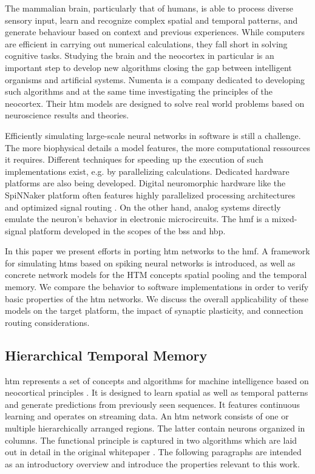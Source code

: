 The mammalian brain, particularly that of humans, is able to process diverse
sensory input, learn and recognize complex spatial and temporal patterns, and
generate behaviour based on context and previous experiences. While computers
are efficient in carrying out numerical calculations, they fall short in solving
cognitive tasks. Studying the brain and the neocortex in particular is an
important step to develop new algorithms closing the gap between intelligent
organisms and artificial systems. Numenta is a company dedicated to developing
such algorithms and at the same time investigating the principles of the
neocortex. Their \gls{htm} models are designed to solve real world problems
based on neuroscience results and theories.

Efficiently simulating large-scale neural networks in software is still a
challenge. The more biophysical details a model features, the more computational
ressources it requires. Different techniques for speeding up the execution of
such implementations exist, e.g. by parallelizing calculations. Dedicated
hardware platforms are also being developed. Digital neuromorphic hardware like
the SpiNNaker platform often features highly parallelized processing
architectures and optimized signal routing \citep{furber2014spinnaker}. On the
other hand, analog systems directly emulate the neuron's behavior in electronic
microcircuits. The \gls{hmf} is a mixed-signal platform developed in the scopes
of the \gls{bss} and \gls{hbp}.

In this paper we present efforts in porting \gls{htm} networks to the \gls{hmf}.
A framework for simulating \glspl{htm} based on spiking neural networks is
introduced, as well as concrete network models for the HTM concepts spatial
pooling and the temporal memory. We compare the behavior to software
implementations in order to verify basic properties of the \gls{htm} networks.
We discuss the overall applicability of these models on the target platform, the
impact of synaptic plasticity, and connection routing considerations.

\subsection{Hierarchical Temporal Memory}

\gls{htm} represents a set of concepts and algorithms for machine intelligence
based on neocortical principles \citep{numenta2011htm}. It is designed to learn
spatial as well as temporal patterns and generate predictions from
previously seen sequences. It features continuous learning and operates
on streaming data. An \gls{htm} network consists of one or multiple
hierarchically arranged regions. The latter contain neurons organized in
columns. The functional principle is captured in two algorithms which are laid
out in detail in the original whitepaper \citep{numenta2011htm}. The following
paragraphs are intended as an introductory overview and introduce the
properties relevant to this work.

